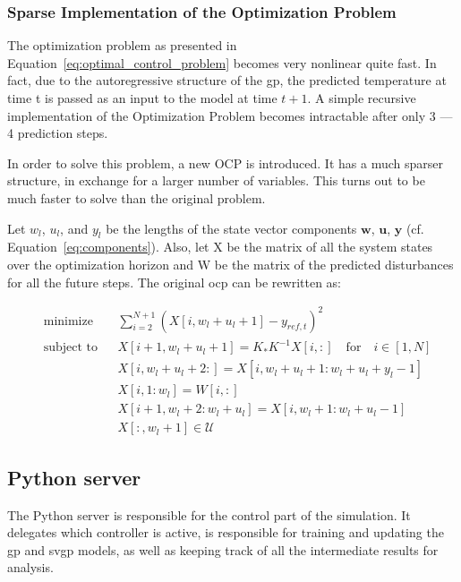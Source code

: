 \subsubsection{Sparse Implementation of the Optimization Problem}

The optimization problem as presented in
Equation~\ref{eq:optimal_control_problem} becomes very nonlinear quite fast. In
fact, due to the autoregressive structure of the \acrshort{gp}, the predicted
temperature at time t is passed as an input to the model at time $t+1$. A simple
recursive implementation of the Optimization Problem becomes intractable after
only 3 --- 4 prediction steps. 

In order to solve this problem, a new OCP is introduced. It has a much sparser
structure, in exchange for a larger number of variables. This turns out to be
much faster to solve than the original problem.

Let $w_l$, $u_l$, and $y_l$ be the lengths of the state vector components
$\mathbf{w}$, $\mathbf{u}$, $\mathbf{y}$ (cf. Equation~\ref{eq:components}).
Also, let X be the matrix of all the system states over the optimization horizon
and W be the matrix of the predicted disturbances for all the future steps. The
original \acrlong{ocp} can be rewritten as:

\begin{subequations}\label{eq:sparse_optimal_control_problem}
    \begin{align}
        & \text{minimize}
        & & \sum_{i=2}^{N + 1} \left(X[i, w_l + u_l + 1] - y_{ref, t}\right)^2 \\
        & \text{subject to}
        & & X[i+1, w_l + u_l + 1] = K_*K^{-1}X[i, :] \quad \text{for} \quad
        i\in[1, N]\\
        &&& X[i, w_l + u_l + 2: ] = X[i, w_l+ u_l + 1: w_l + u_l + y_l - 1]\\
        &&& X[i, 1:w_l] = W[i, :] \\
        &&& X[i+1, w_l + 2: w_l + u_l] = X[i, w_l + 1: w_l + u_l - 1] \\
        &&& X[:, w_l + 1] \in \mathcal{U}
    \end{align}
\end{subequations}

\subsection{Python server}

The Python server is responsible for the control part of the simulation. It
delegates which controller is active, is responsible for training and updating
the \acrshort{gp} and \acrshort{svgp} models, as well as keeping track of all
the intermediate results for analysis.

